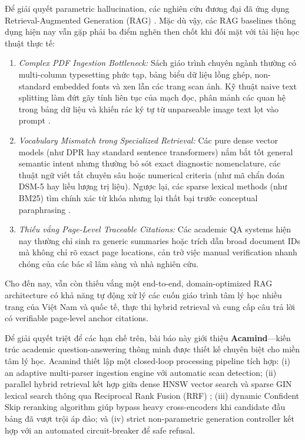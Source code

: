 \documentclass[10pt]{SPIIRAS_Proceedings}
\begin{document}
Để giải quyết parametric hallucination, các nghiên cứu đương đại đã ứng dụng Retrieval-Augmented Generation (RAG) \cite{lewis2020retrieval}. Mặc dù vậy, các RAG baselines thông dụng hiện nay vẫn gặp phải ba điểm nghẽn then chốt khi đối mặt với tài liệu học thuật thực tế:
\begin{enumerate}
    \item \textit{Complex PDF Ingestion Bottleneck:} Sách giáo trình chuyên ngành thường có multi-column typesetting phức tạp, bảng biểu dữ liệu lồng ghép, non-standard embedded fonts và xen lẫn các trang scan ảnh. Kỹ thuật naive text splitting làm đứt gãy tính liên tục của mạch đọc, phân mảnh các quan hệ trong bảng dữ liệu và khiến rác ký tự từ unparseable image text lọt vào prompt \cite{elbachyr2024empirical, santos2026pdf}.
    \item \textit{Vocabulary Mismatch trong Specialized Retrieval:} Các pure dense vector models (như DPR hay standard sentence transformers) nắm bắt tốt general semantic intent nhưng thường bỏ sót exact diagnostic nomenclature, các thuật ngữ viết tắt chuyên sâu hoặc numerical criteria (như mã chẩn đoán DSM-5 hay liều lượng trị liệu). Ngược lại, các sparse lexical methods (như BM25) tìm chính xác từ khóa nhưng lại thất bại trước conceptual paraphrasing \cite{karpukhin2020dense, formal2021splade}.
    \item \textit{Thiếu vắng Page-Level Traceable Citations:} Các academic QA systems hiện nay thường chỉ sinh ra generic summaries hoặc trích dẫn broad document IDs mà không chỉ rõ exact page locations, cản trở việc manual verification nhanh chóng của các bác sĩ lâm sàng và nhà nghiên cứu.
\end{enumerate}
Cho đến nay, vẫn còn thiếu vắng một end-to-end, domain-optimized RAG architecture có khả năng tự động xử lý các cuốn giáo trình tâm lý học nhiều trang của Việt Nam và quốc tế, thực thi hybrid retrieval và cung cấp câu trả lời có verifiable page-level anchor citations.

Để giải quyết triệt để các hạn chế trên, bài báo này giới thiệu \textbf{Acamind}---kiến trúc academic question-answering thông minh được thiết kế chuyên biệt cho miền tâm lý học. Acamind thiết lập một closed-loop processing pipeline tích hợp: (i) an adaptive multi-parser ingestion engine với automatic scan detection; (ii) parallel hybrid retrieval kết hợp giữa dense HNSW vector search \cite{wang2022text, malkov2020efficient} và sparse GIN lexical search \cite{formal2021splade} thông qua Reciprocal Rank Fusion (RRF) \cite{cormack2009reciprocal}; (iii) dynamic Confident Skip reranking algorithm giúp bypass heavy cross-encoders khi candidate đầu bảng đã vượt trội áp đảo; và (iv) strict non-parametric generation controller kết hợp với an automated circuit-breaker để safe refusal.
\end{document}

